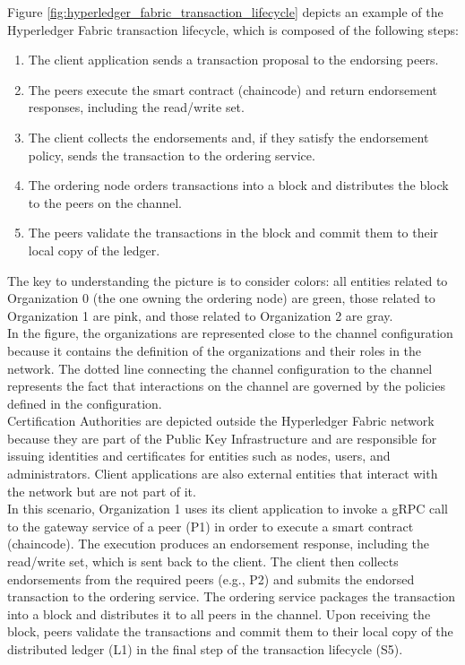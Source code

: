 \documentclass{scrbook}
\begin{document}
Figure \ref{fig:hyperledger_fabric_transaction_lifecycle} depicts an example of the Hyperledger Fabric transaction lifecycle, which is composed of the following steps:
\begin{enumerate}
    \item The client application sends a transaction proposal to the endorsing peers.
    \item The peers execute the smart contract (chaincode) and return endorsement responses, including the read/write set.
    \item The client collects the endorsements and, if they satisfy the endorsement policy, sends the transaction to the ordering service.
    \item The ordering node orders transactions into a block and distributes the block to the peers on the channel.
    \item The peers validate the transactions in the block and commit them to their local copy of the ledger.
\end{enumerate}

The key to understanding the picture is to consider colors: all entities related to Organization 0 (the one owning the ordering node) are green, those related to Organization 1 are pink, and those related to Organization 2 are gray.\\

In the figure, the organizations are represented close to the channel configuration because it contains the definition of the organizations and their roles in the network. The dotted line connecting the channel configuration to the channel represents the fact that interactions on the channel are governed by the policies defined in the configuration.\\

Certification Authorities are depicted outside the Hyperledger Fabric network because they are part of the Public Key Infrastructure and are responsible for issuing identities and certificates for entities such as nodes, users, and administrators. Client applications are also external entities that interact with the network but are not part of it.\\

In this scenario, Organization 1 uses its client application to invoke a gRPC call to the gateway service of a peer (P1) in order to execute a smart contract (chaincode). The execution produces an endorsement response, including the read/write set, which is sent back to the client. The client then collects endorsements from the required peers (e.g., P2) and submits the endorsed transaction to the ordering service. The ordering service packages the transaction into a block and distributes it to all peers in the channel. Upon receiving the block, peers validate the transactions and commit them to their local copy of the distributed ledger (L1) in the final step of the transaction lifecycle (S5).
\end{document}
